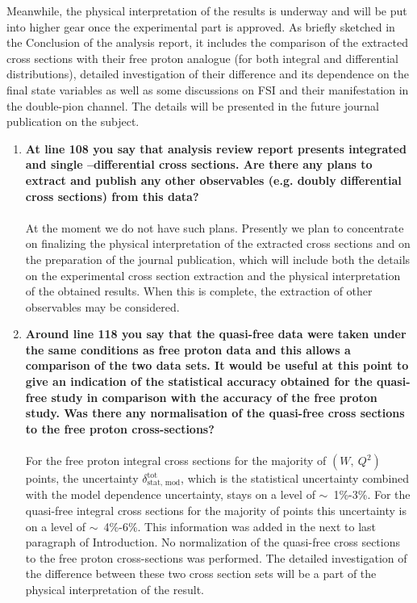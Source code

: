 \documentclass[,superscriptaddress,showpacs,amssymb,amsmath,amsfonts,linenumbers,article]{revtex4-1}
\begin{document}
Meanwhile, the physical interpretation of the results is underway and will be put into higher gear once the experimental part is approved. As briefly sketched in the Conclusion of the analysis report, it includes the comparison of the extracted cross sections with their free proton analogue (for both integral and differential distributions), detailed investigation of their difference and its dependence on the final state variables as well as some discussions on FSI and their manifestation in the double-pion channel. The details will be presented in the future journal publication on the subject. 

\vspace{0.5cm}

\begin{enumerate}[label=\textbf{\arabic*}.]

\item {\bf At line 108 you say that analysis review report presents integrated and single –differential cross sections. Are there any plans to extract and publish any other observables (e.g. doubly differential cross sections) from this data?}\\ \\
At the moment we do not have such plans. Presently we plan to concentrate on finalizing the physical interpretation of the extracted cross sections  and on the preparation of the journal publication, which will include both the details on the experimental cross section extraction and the physical interpretation of the obtained results. When this is complete, the extraction of other observables may be considered.


\item {\bf Around line 118 you say that the quasi-free data were taken under the same conditions as free proton data and this allows a comparison of the two data sets. It would be useful at this point to give an indication of the statistical accuracy obtained for the quasi-free study in comparison with the accuracy of the free proton study. Was there any normalisation of the quasi-free cross sections to the free proton cross-sections?}\\ \\
For the free proton integral cross sections for the majority of $(W,~Q^{2})$ points, the uncertainty $\delta_{\text{stat,~mod}}^{\text{tot}}$, which is the statistical uncertainty combined with the model dependence uncertainty, stays on a level of $\sim$~1\%-3\%. For the quasi-free integral cross sections for the majority of points this uncertainty is on a level of $\sim$~4\%-6\%. This information was added in the next to last paragraph of Introduction. No normalization of the quasi-free cross sections to the free proton cross-sections was performed. The detailed investigation of the difference between these two cross section sets will be a part of the physical interpretation of the result.


\end{enumerate}
\end{document}
